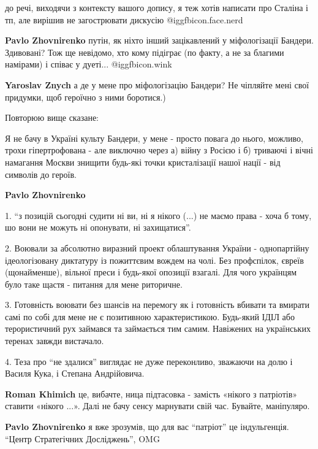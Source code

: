 \begin{itemize}
\begin{itemize}
до речі, виходячи з контексту вашого допису, я теж хотів написати про Сталіна і
тп, але вирішив не загострювати дискусію @igg{fbicon.face.nerd} 


\textbf{Pavlo Zhovnirenko} путін, як ніхто інший зацікавлений у міфологізації Бандери. Здивовані? Тож ще невідомо, хто кому підіграє (по факту, а не за благими намірами) і співає у дуеті... @igg{fbicon.wink} 

\textbf{Yaroslav Znych} а де у мене про міфологізацію Бандери? Не чіпляйте мені свої придумки, щоб героїчно з ними боротися.)

Повторюю вище сказане:

Я не бачу в Україні культу Бандери, у мене - просто повага до нього, можливо,
трохи гіпертрофована - але виключно через а) війну з Росією і б) триваючі і
вічні намагання Москви знищити будь-які точки кристалізації нашої нації - від
символів до героїв.


\textbf{Pavlo Zhovnirenko} 

1. \enquote{з позицій сьогодні судити ні ви, ні я нікого (...) не маємо права -
хоча б тому, шо вони не можуть ні опонувати, ні захищатися}.

2. Воювали за абсолютно виразний проект облаштування України - однопартійну
ідеологізовану диктатуру із пожиттєвим вождем на чолі. Без профспілок, євреїв
(щонайменше), вільної преси і будь-якої опозиції взагалі. Для чого українцям
було таке щастя - питання для мене риторичне.

3. Готовність воювати без шансів на перемогу як і готовність вбивати та вмирати
самі по собі для мене не є позитивною характеристикою. Будь-який ІДІЛ або
терористичний рух займався та займається тим самим. Навіжених на українських
теренах завжди вистачало.

4. Теза про \enquote{не здалися} виглядає не дуже переконливо, зважаючи на долю
і Василя Кука, і Степана Андрійовича.


\textbf{Roman Khimich} це, вибачте, ница підтасовка - замість «нікого з патріотів» ставити «нікого ...». Далі не бачу сенсу марнувати свій час. Бувайте, маніпуляро.

\textbf{Pavlo Zhovnirenko} я вже зрозумів, що для вас \enquote{патріот} це індульгенція.
\enquote{Центр Стратегічних Досліджень}, OMG

\end{itemize} %



\end{itemize}
